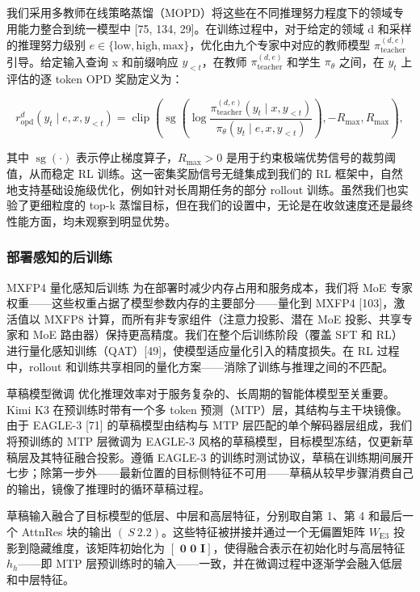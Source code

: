 我们采用多教师在线策略蒸馏（MOPD）将这些在不同推理努力程度下的领域专用能力整合到统一模型中 {[}75, 134, 29{]}。在训练过程中，对于给定的领域 d 和采样的推理努力级别 \(e \in \{ \mathrm { l o w } , \mathrm { h i g h } , \mathrm { m a x } \}\)，优化由九个专家中对应的教师模型 \(\pi _ { \mathrm { t e a c h e r } } ^ { ( d , e ) }\) 引导。给定输入查询 x 和前缀响应 \(y _ { < t }\)，在教师 \(\pi _ { \mathrm { t e a c h e r } } ^ { ( d , e ) }\) 和学生 \(\pi _ { \theta }\) 之间，在 \(y _ { t }\) 上评估的逐 token OPD 奖励定义为：

\[
r _ {\mathrm{opd}} ^ {d} (y _ {t} \mid e, x, y _ {<   t}) = \operatorname{clip} \left(\operatorname{sg} \left(\log \frac {\pi_ {\text {teacher}} ^ {(d , e)} (y _ {t} \mid x , y _ {<   t})}{\pi_ {\theta} (y _ {t} \mid e , x , y _ {<   t})}\right), - R _ {\max}, R _ {\max}\right),\tag{15}
\]

其中 \(\operatorname { s g } ( \cdot )\) 表示停止梯度算子，\(R _ { \operatorname* { m a x } } > 0\) 是用于约束极端优势信号的裁剪阈值，从而稳定 RL 训练。这一密集奖励信号无缝集成到我们的 RL 框架中，自然地支持基础设施级优化，例如针对长周期任务的部分 rollout 训练。虽然我们也实验了更细粒度的 top-k 蒸馏目标，但在我们的设置中，无论是在收敛速度还是最终性能方面，均未观察到明显优势。

\subsubsection{部署感知的后训练}\label{deployment-aware-post-training}

MXFP4 量化感知后训练 为在部署时减少内存占用和服务成本，我们将 MoE 专家权重——这些权重占据了模型参数内存的主要部分——量化到 MXFP4 {[}103{]}，激活值以 MXFP8 计算，而所有非专家组件（注意力投影、潜在 MoE 投影、共享专家和 MoE 路由器）保持更高精度。我们在整个后训练阶段（覆盖 SFT 和 RL）进行量化感知训练（QAT）{[}49{]}，使模型适应量化引入的精度损失。在 RL 过程中，rollout 和训练共享相同的量化方案——消除了训练与推理之间的不匹配。

草稿模型微调 优化推理效率对于服务复杂的、长周期的智能体模型至关重要。Kimi K3 在预训练时带有一个多 token 预测（MTP）层，其结构与主干块镜像。由于 EAGLE-3 {[}71{]} 的草稿模型由结构与 MTP 层匹配的单个解码器层组成，我们将预训练的 MTP 层微调为 EAGLE-3 风格的草稿模型，目标模型冻结，仅更新草稿层及其特征融合投影。遵循 EAGLE-3 的训练时测试协议，草稿在训练期间展开七步；除第一步外——最新位置的目标侧特征不可用——草稿从较早步骤消费自己的输出，镜像了推理时的循环草稿过程。

草稿输入融合了目标模型的低层、中层和高层特征，分别取自第 1、第 4 和最后一个 AttnRes 块的输出 \(( \ S ~ 2 . 2 )\)。这些特征被拼接并通过一个无偏置矩阵 \(W _ { \mathrm { E 3 } }\) 投影到隐藏维度，该矩阵初始化为 \(\left[ \textbf { 0 0 } \pmb { I } \right]\)，使得融合表示在初始化时与高层特征 \(h _ { h }\)——即 MTP 层预训练时的输入——一致，并在微调过程中逐渐学会融入低层和中层特征。


